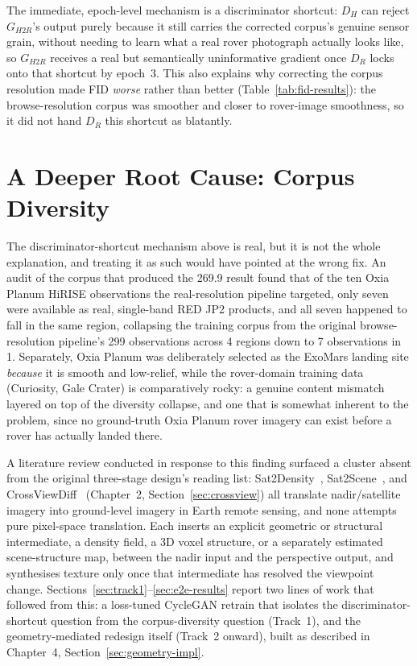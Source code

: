 The immediate, epoch-level mechanism is a discriminator shortcut: $D_H$ can reject $G_{H2R}$'s output purely because it still carries the corrected corpus's genuine sensor grain, without needing to learn what a real rover photograph actually looks like, so $G_{H2R}$ receives a real but semantically uninformative gradient once $D_R$ locks onto that shortcut by epoch~3. This also explains why correcting the corpus resolution made FID \emph{worse} rather than better (Table~\ref{tab:fid-results}): the browse-resolution corpus was smoother and closer to rover-image smoothness, so it did not hand $D_R$ this shortcut as blatantly.

\section{A Deeper Root Cause: Corpus Diversity}
\label{sec:diagnosis}

The discriminator-shortcut mechanism above is real, but it is not the whole explanation, and treating it as such would have pointed at the wrong fix. An audit of the corpus that produced the 269.9 result found that of the ten Oxia Planum HiRISE observations the real-resolution pipeline targeted, only seven were available as real, single-band RED JP2 products, and all seven happened to fall in the same region, collapsing the training corpus from the original browse-resolution pipeline's 299 observations across 4 regions down to 7 observations in 1. Separately, Oxia Planum was deliberately selected as the ExoMars landing site \emph{because} it is smooth and low-relief, while the rover-domain training data (Curiosity, Gale Crater) is comparatively rocky: a genuine content mismatch layered on top of the diversity collapse, and one that is somewhat inherent to the problem, since no ground-truth Oxia Planum rover imagery can exist before a rover has actually landed there.

A literature review conducted in response to this finding surfaced a cluster absent from the original three-stage design's reading list: Sat2Density~\cite{qian2023sat2density}, Sat2Scene~\cite{li2024sat2scene}, and CrossViewDiff~\cite{li2024crossviewdiff} (Chapter~2, Section~\ref{sec:crossview}) all translate nadir/satellite imagery into ground-level imagery in Earth remote sensing, and none attempts pure pixel-space translation. Each inserts an explicit geometric or structural intermediate, a density field, a 3D voxel structure, or a separately estimated scene-structure map, between the nadir input and the perspective output, and synthesises texture only once that intermediate has resolved the viewpoint change. Sections~\ref{sec:track1}--\ref{sec:e2e-results} report two lines of work that followed from this: a loss-tuned CycleGAN retrain that isolates the discriminator-shortcut question from the corpus-diversity question (Track~1), and the geometry-mediated redesign itself (Track~2 onward), built as described in Chapter~4, Section~\ref{sec:geometry-impl}.

